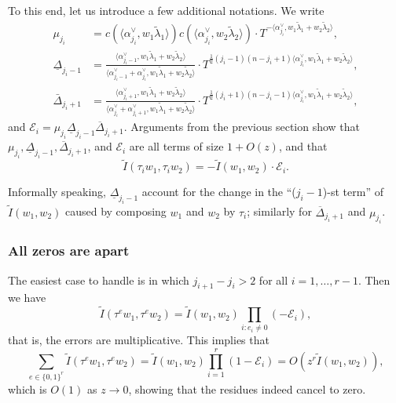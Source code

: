 \documentclass[11pt]{amsart}
\numberwithin{theorem}{section}
\numberwithin{equation}{section}
\theoremstyle{remark}
\theoremstyle{definition}
\begin{document}
To this end, let us introduce a few additional notations. We write
\begin{align*}
\mu_{j_i} &= c(\langle \alpha^\vee_{j_i},w_1\tilde\lambda_1\rangle)c(\langle \alpha^\vee_{j_i},w_2\tilde\lambda_2\rangle)\cdot T^{-\langle \alpha^\vee_{j_i},w_1\tilde\lambda_1+w_2\tilde\lambda_2\rangle}, \\
\underline{\Delta}_{j_i-1} &= \frac{\langle \alpha^\vee_{j_i-1},w_1\tilde\lambda_1+w_2\tilde\lambda_2\rangle }{\langle \alpha^\vee_{j_i-1}+\alpha^\vee_{j_i}, w_1\tilde\lambda_1+w_2\tilde\lambda_2\rangle} \cdot {T^{\frac{1}{2}(j_i-1)(n-j_i+1)\langle \alpha^\vee_{j_i},w_1\tilde\lambda_1+w_2\tilde\lambda_2\rangle}}, \\
\bar\Delta_{j_i+1} &= \frac{\langle \alpha^\vee_{j_i+1},w_1\tilde\lambda_1+w_2\tilde\lambda_2\rangle }{\langle \alpha^\vee_{j_i}+\alpha^\vee_{j_i+1}, w_1\tilde\lambda_1+ w_2\tilde\lambda_2\rangle}\cdot {T^{\frac{1}{2}(j_i+1)(n-j_i-1)\langle \alpha^\vee_{j_i},w_1\tilde\lambda_1+w_2\tilde\lambda_2\rangle}},
\end{align*}
and $\mathcal E_i = \mu_{j_i}\underline{\Delta}_{j_i-1}\overline\Delta_{j_i+1}$. Arguments from the previous section show that $\mu_{j_i},\underline{\Delta}_{j_i-1},\overline\Delta_{j_i+1}$, and $\mathcal E_i$ are all terms of size $1+O(z)$, and that
\begin{equation*}
\tilde I(\tau_iw_1,\tau_iw_2) = -\tilde I(w_1,w_2) \cdot \mathcal E_i.
\end{equation*}

Informally speaking, $\underline{\Delta}_{j_i-1}$ account for the change in the ``($j_i-1$)-st term'' of $\tilde I(w_1,w_2)$ caused by composing $w_1$ and $w_2$ by $\tau_i$; similarly for $\overline\Delta_{j_i+1}$ and $\mu_{j_i}$.




\subsubsection{All zeros are apart}

The easiest case to handle is in which $j_{i+1}-j_i > 2$ for all $i=1,\ldots,r-1$. Then we have
\begin{equation*}
\tilde I(\tau^ew_1,\tau^ew_2) = \tilde I(w_1,w_2)\prod_{i:e_i\neq 0} (-\mathcal E_i),
\end{equation*}
that is, the errors are multiplicative. This implies that 
\begin{equation*}
\sum_{e \in \{0,1\}^r} \tilde I(\tau^{e}w_1,\tau^{e}w_2)=\tilde I(w_1,w_2)\prod_{i=1}^r(1-\mathcal E_i) = O(z^r\tilde I(w_1,w_2)),
\end{equation*}
which is $O(1)$ as $z \rightarrow 0$, showing that the residues indeed cancel to zero.
\end{document}
